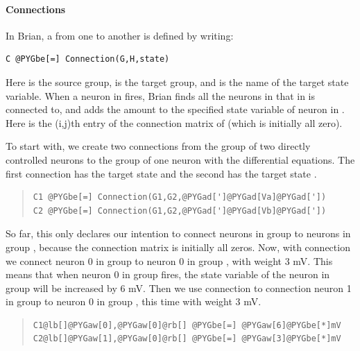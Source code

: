 \documentclass[letterpaper,10pt,english]{manual}
\begin{document}
\paragraph{Connections}

In Brian, a \hyperlink{brian.Connection}{} from one \hyperlink{brian.NeuronGroup}{} to another is
defined by writing:

\begin{Verbatim}[commandchars=@\[\]]
C @PYGbe[=] Connection(G,H,state)
\end{Verbatim}

Here  is the source group,  is the target group, and  is the
name of the target state variable. When a neuron  in  fires, Brian
finds all the neurons  in  that  in  is connected to, and adds
the amount  to the specified state variable of neuron  in .
Here  is the (i,j)th entry of the connection matrix of  (which
is initially all zero).

To start with, we create two connections from the group of two
directly controlled neurons to the group of one neuron with the
differential equations. The first connection has the target state 
and the second has the target state .
\begin{quote}

\begin{Verbatim}[commandchars=@\[\]]
C1 @PYGbe[=] Connection(G1,G2,@PYGad[']@PYGad[Va]@PYGad['])
C2 @PYGbe[=] Connection(G1,G2,@PYGad[']@PYGad[Vb]@PYGad['])
\end{Verbatim}
\end{quote}

So far, this only declares our intention to connect neurons in group
 to neurons in group , because the connection matrix is initially
all zeros. Now, with connection  we connect neuron 0 in group 
to neuron 0 in group , with weight 3 mV. This means that when neuron
0 in group  fires, the state variable  of the neuron in group 
will be increased by 6 mV. Then we use connection  to connection
neuron 1 in group  to neuron 0 in group , this time with weight
3 mV.
\begin{quote}

\begin{Verbatim}[commandchars=@\[\]]
C1@lb[]@PYGaw[0],@PYGaw[0]@rb[] @PYGbe[=] @PYGaw[6]@PYGbe[*]mV
C2@lb[]@PYGaw[1],@PYGaw[0]@rb[] @PYGbe[=] @PYGaw[3]@PYGbe[*]mV
\end{Verbatim}
\end{quote}
\end{document}
